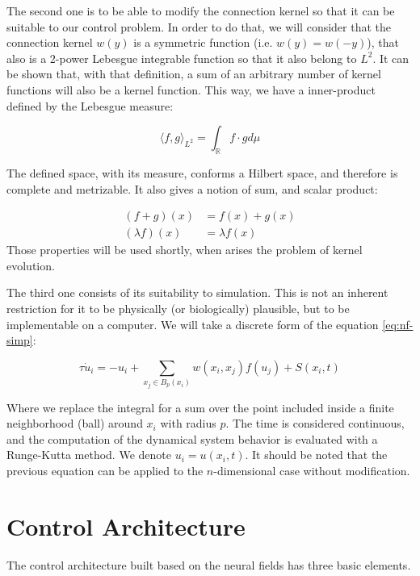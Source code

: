 The second one is to be able to modify the connection kernel so that
it can be suitable to our control problem. In order to do that, we
will consider that the connection kernel $w(y)$ is a symmetric
function (i.e. $w(y)=w(-y)$), that also is a 2-power Lebesgue
integrable function so that it also belong to $L^2$. It can be shown
that, with that definition, a sum of an arbitrary number of kernel
functions will also be a kernel function. This way, we have a
inner-product defined by the Lebesgue measure:

\begin{equation}
  \label{eq:eq-l2}
  \langle f,g \rangle_{L^2} = \int_{\mathbb{R}}{f\cdot g d\mu}
\end{equation}

The defined space, with its measure, conforms a Hilbert space, and
therefore is complete and metrizable. It also gives a notion of sum,
and scalar product:

\begin{align}
  \label{eq:eq-leb-opers}
  (f+g)(x)&=f(x)+g(x) \\
  (\lambda f)(x)&=\lambda f(x)
\end{align}
Those properties will be used shortly, when arises the problem of
kernel evolution.

The third one consists of its suitability to simulation. This is not an
inherent restriction for it to be physically (or biologically)
plausible, but to be implementable on a computer. We will take a
discrete form of the equation \ref{eq:nf-simp}:

\begin{equation}
  \label{eq:nf-disc}
  \tau \dot{u}_i=-u_i+\sum_{x_j \in B_p(x_i)} {w\left(x_i,x_j\right)
    f\left( u_j \right)}+S(x_i,t)
\end{equation}

Where we replace the integral for a sum over the point included inside
a finite neighborhood (ball) around $x_i$ with radius $p$. The time is considered
continuous, and the computation of the dynamical system behavior is
evaluated with a Runge-Kutta method. We denote $u_i=u(x_i,t)$. It
should be noted that the previous equation can be applied to the
$n$-dimensional case without modification.

\section{Control Architecture}
The control architecture built based on the neural fields has three
basic elements.

